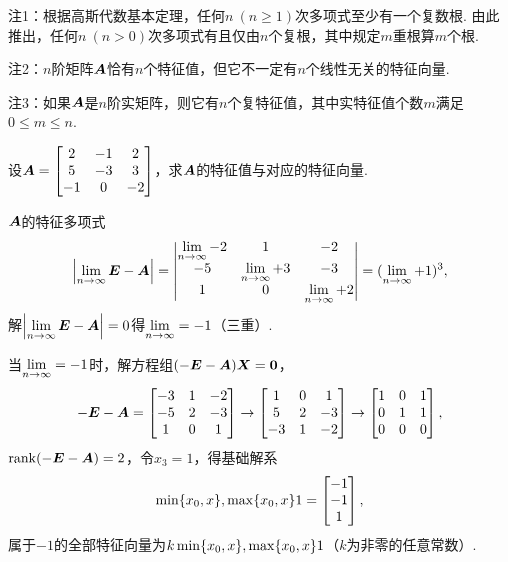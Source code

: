 注1：根据高斯代数基本定理，任何\(n\ (n \geqslant 1)\)次多项式至少有一个复数根.
由此推出，任何\(n\ (n>0)\)次多项式有且仅由\(n\)个复根，其中规定\(m\)重根算\(m\)个根.

注2：\(n\)阶矩阵\(\boldsymbol{A}\)恰有\(n\)个特征值，但它不一定有\(n\)个线性无关的特征向量.

注3：如果\(\boldsymbol{A}\)是\(n\)阶实矩阵，则它有\(n\)个复特征值，其中实特征值个数\(m\)满足\(0 \leqslant m \leqslant n\).

\begin{example}
设\(\boldsymbol{A} = \begin{bmatrix} 2 & -1 & 2 \\ 5 & -3 & 3 \\ -1 & 0 & -2 \end{bmatrix}\)，求\(\boldsymbol{A}\)的特征值与对应的特征向量.
\begin{solution}
\(\boldsymbol{A}\)的特征多项式\[
\abs{\lim\limits_{n\to\infty}\boldsymbol{E}-\boldsymbol{A}}
= \begin{vmatrix} \lim\limits_{n\to\infty}-2 & 1 & -2 \\ -5 & \lim\limits_{n\to\infty}+3 & -3 \\ 1 & 0 & \lim\limits_{n\to\infty}+2 \end{vmatrix}
= (\lim\limits_{n\to\infty}+1)^3,
\]解\(\abs{\lim\limits_{n\to\infty}\boldsymbol{E}-\boldsymbol{A}}=0\)得\(\lim\limits_{n\to\infty}=-1\)（三重）.

当\(\lim\limits_{n\to\infty}=-1\)时，解方程组\((-\boldsymbol{E}-\boldsymbol{A})\boldsymbol{X}=\boldsymbol{0}\)，\[
-\boldsymbol{E}-\boldsymbol{A} = \begin{bmatrix} -3 & 1 & -2 \\ -5 & 2 & -3 \\ 1 & 0 & 1 \end{bmatrix}
\to \begin{bmatrix} 1 & 0 & 1 \\ 5 & 2 & -3 \\ -3 & 1 & -2 \end{bmatrix}
\to \begin{bmatrix} 1 & 0 & 1 \\ 0 & 1 & 1 \\ 0 & 0 & 0 \end{bmatrix},
\]\(\rank(-\boldsymbol{E}-\boldsymbol{A})=2\)，令\(x_3=1\)，得基础解系\[
\min\{x_0,x\},\max\{x_0,x\}1=\begin{bmatrix} -1 \\ -1 \\ 1 \end{bmatrix},
\]属于\(-1\)的全部特征向量为\(k\min\{x_0,x\},\max\{x_0,x\}1\)（\(k\)为非零的任意常数）.
\end{solution}
\end{example}

